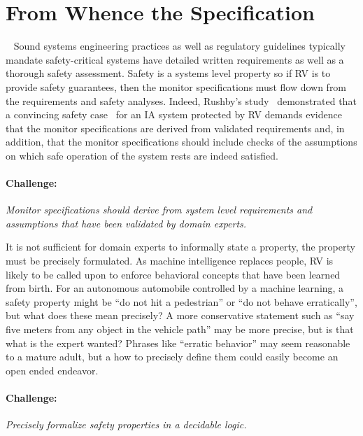 \section{From Whence the Specification}~\label{sec:req}
Sound systems engineering practices  as well
as regulatory guidelines typically mandate safety-critical systems
have detailed written requirements as well as a thorough safety
assessment. Safety is a systems level property so if RV is  to  provide safety guarantees,
then the  monitor specifications must flow down from the requirements
and safety analyses.   Indeed, Rushby's study~\cite{rvRushby,RushbyAIAA09} demonstrated
that  a convincing safety case~\cite{Kelly98arguingsafety} for an IA
system protected by RV  demands evidence that the
monitor specifications are  derived from validated requirements and, in
addition, that the monitor specifications should include checks of the assumptions on
which safe operation of the system rests  are indeed satisfied.



\paragraph{Challenge:}   \emph{ Monitor specifications should derive from
  system level requirements and assumptions that have been validated
  by domain experts.} 

It is not sufficient for   domain experts to informally state a
property, the property must be precisely formulated.  As machine
intelligence replaces people,  RV is likely to be called upon to
enforce behavioral concepts that have been learned from birth.     For an  autonomous
automobile controlled by a machine learning, a safety property might
be ``do not hit a pedestrian'' or ``do  not behave erratically'', but
what does these mean precisely?  A more conservative statement such as
``say five meters from any object in the vehicle path'' may be more
precise, but is that what is the expert wanted?   Phrases like
``erratic behavior'' may seem reasonable to a mature adult, but a how
to precisely define them could easily become an open ended endeavor. 

\paragraph{Challenge:} \emph{Precisely formalize safety properties in
  a decidable logic.}


